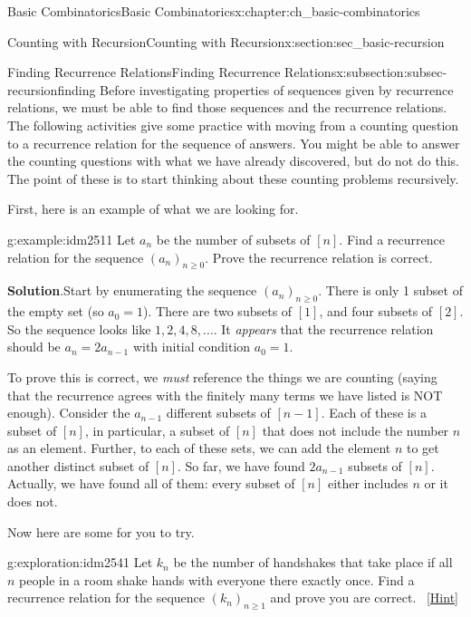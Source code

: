 \documentclass[oneside,10pt,]{book}
\numberwithin{equation}{chapter}
\begin{document}
\begin{chapterptx}{Basic Combinatorics}{}{Basic Combinatorics}{}{}{x:chapter:ch_basic-combinatorics}
\begin{sectionptx}{Counting with Recursion}{}{Counting with Recursion}{}{}{x:section:sec_basic-recursion}
\typeout{************************************************}
%
\begin{subsectionptx}{Finding Recurrence Relations}{}{Finding Recurrence Relations}{}{}{x:subsection:subsec-recursionfinding}
Before investigating properties of sequences given by recurrence relations, we must be able to find those sequences and the recurrence relations.  The following activities give some practice with moving from a counting question to a recurrence relation for the sequence of answers.  You might be able to answer the counting questions with what we have already discovered, but do not do this.  The point of these is to start thinking about these counting problems recursively.%
\par
First, here is an example of what we are looking for.%
\begin{example}{}{g:example:idm2511}%
Let \(a_n\) be the number of subsets of \([n]\).  Find a recurrence relation for the sequence \((a_n)_{n \ge 0}\).  Prove the recurrence relation is correct.%
\par\smallskip%
\noindent\textbf{Solution}.\hypertarget{g:solution:idm2517}{}\quad{}Start by enumerating the sequence \((a_n)_{n \ge 0}\).  There is only 1 subset of the empty set (so \(a_0 = 1\)).  There are two subsets of \([1]\), and four subsets of \([2]\).  So the sequence looks like \(1, 2, 4, 8, \ldots\).  It \emph{appears} that the recurrence relation should be \(a_n = 2a_{n-1}\) with initial condition \(a_0 = 1\).%
\par
To prove this is correct, we \emph{must} reference the things we are counting (saying that the recurrence agrees with the finitely many terms we have listed is NOT enough).  Consider the \(a_{n-1}\) different subsets of \([n-1]\).  Each of these is a subset of \([n]\), in particular, a subset of \([n]\) that does not include the number \(n\) as an element.  Further, to each of these sets, we can add the element \(n\) to get another distinct subset of \([n]\).  So far, we have found \(2a_{n-1}\) subsets of \([n]\).  Actually, we have found all of them: every subset of \([n]\) either includes \(n\) or it does not.%
\end{example}
Now here are some for you to try.%
\begin{exploration}{}{g:exploration:idm2541}%
Let \(k_n\) be the number of handshakes that take place if all \(n\) people in a room shake hands with everyone there exactly once.  Find a recurrence relation for the sequence \((k_n)_{n \ge 1}\) and prove you are correct.%
\qquad~\hfill{\tiny\hyperlink{g:hint:idm2547-back}{[Hint]}}\end{exploration}

\end{subsectionptx}
\end{sectionptx}
\end{chapterptx}
\end{document}
